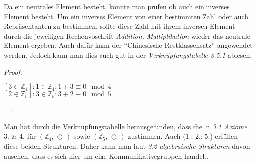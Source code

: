 \documentclass{scrreprt}
\theoremstyle{remark}
\begin{document}
Da ein neutrales Element besteht, könnte man prüfen ob auch ein inverses Element besteht. Um ein inverses Element von einer bestimmten Zahl oder auch Repräsentanten zu bestimmen, sollte diese Zahl mit ihrem inversen Element durch die jeweiligen Rechenvoschrift \textit{Addition, Multiplikation} wieder das neutrale Element ergeben. Auch dafür kann der ``Chinesische Restklassensatz'' angewendet werden. Jedoch kann man dies auch gut in der \textit{Verknüpfungstabelle 3.5.1} ablesen.
\begin{proof}
  \hfill
  \begin{center}
    $ \left[3 \in\mathbb{Z}_{4}\right]:1 \in\mathbb{Z}_{4}: 1+3\equiv0 \mod 4$ \\
     $ \left[2 \in\mathbb{Z}_{5}\right]:3 \in\mathbb{Z}_{5}: 3+2\equiv 0 \mod 5$
    \end{center}
\end{proof}
Man hat durch die Verknüpfungstabelle herausgefunden, dass die in \textit{3.1 Axiome} 3. \& 4. für $(\mathbb{Z}_{4},\,\oplus\,)$ sowie $(\mathbb{Z}_{5},\,\oplus\,)$ zustimmen. Auch (1.; 2.; 5.) erfüllen diese beiden Strukturen. Daher kann man laut \textit{3.2 algebraische Strukturen} davon ausehen, dass es sich hier um eine Kommunikativegruppen handelt.
\end{document}
